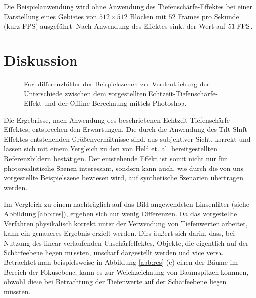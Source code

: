 \documentclass{acmsiggraph}                     %
\begin{document}
Die Beispielanwendung wird ohne Anwendung des Tiefenschärfe-Effektes bei einer Darstellung eines Gebietes von $512 \times 512$ Blöcken mit $52$ Frames pro Sekunde (kurz FPS) ausgeführt. Nach Anwendung des Effektes sinkt der Wert auf $51\;\textnormal{FPS}$.

\section{Diskussion}

\begin{figure}[p]
	\centering
	\qquad
\caption{Farbdifferenzbilder der Beispielszenen zur Verdeutlichung der Unterschiede zwischen dem vorgestellten Echtzeit-Tiefenschärfe-Effekt und der Offline-Berechnung mittels Photoshop.}
	\label{abb:diff}
\end{figure}

Die Ergebnisse, nach Anwendung des beschriebenen Echtzeit-Tiefenschärfe-Effektes, entsprechen den Erwartungen. Die durch die Anwendung des Tilt-Shift-Effektes entstehenden Größenverhältnisse sind, aus subjektiver Sicht, korrekt und lassen sich mit einem Vergleich zu den von Held et. al. bereitgestellten Referenzbildern bestätigen. Der entstehende Effekt ist somit nicht nur für photorealistische Szenen interessant, sondern kann auch, wie durch die von uns vorgestellte Beispielszene bewiesen wird, auf synthetische Szenarien übertragen werden.

Im Vergleich zu einem nachträglich auf das Bild angewendeten Linsenfilter (siehe Abbildung \ref{abb:res}), ergeben sich nur wenig Differenzen. Da das vorgestellte Verfahren physikalisch korrekt unter der Verwendung von Tiefenwerten arbeitet, kann ein genaueres Ergebnis erzielt werden. Dies äußert sich darin, dass, bei Nutzung des linear verlaufenden Unschärfeffektes, Objekte, die eigentlich auf der Schärfeebene liegen müssten, unscharf dargestellt werden und vice versa. Betrachtet man beispielsweise in Abbildung \ref{abb:res} (e) einen der Bäume im Bereich der Fokusebene, kann es zur Weichzeichnung von Baumspitzen kommen, obwohl diese bei Betrachtung der Tiefenwerte auf der Schärfeebene liegen müssten.
\end{document}
